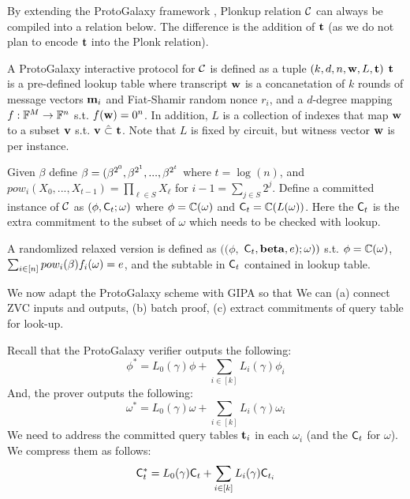 By extending the ProtoGalaxy framework \cite{ProtoGalaxy},
Plonkup relation $\mathcal C$ can always be compiled into a
relation below. The difference is the addition of ${{\mathbf {t}}}$
(as we do not plan to encode ${{\mathbf {t}}}$ into the Plonk relation).

\begin{definition} A ProtoGalaxy interactive protocol for
$\mathcal C$ is defined as a tuple $(k, d, n, {{\mathbf {w}}}, L, {{\mathbf {t}}})$
${{\mathbf {t}}}$ is a pre-defined lookup table
where transcript ${{\mathbf {w}}}$ is a concanetation of
$k$ rounds of message vectors ${{\mathbf {m}}}_i$ and 
Fiat-Shamir random nonce $r_i$, and a $d$-degree mapping
$f: \mathbb{F}^M \rightarrow \mathbb{F}^n$ s.t. 
$f({{\mathbf {w}}}) = 0^n$. In addition, $L$ is a collection of
indexes that map ${{\mathbf {w}}}$ to a subset ${{\mathbf {v}}}$ s.t.
${{\mathbf {v}}} ~\hat{\subset}~ {{\mathbf {t}}}$. Note that $L$ is fixed by circuit,
but witness vector ${{\mathbf {w}}}$ is per instance.
\end{definition}

\begin{definition} Given $\beta$ define 
${{\mathbf {\beta}}} = (\beta^{2^0}, \beta^{2^1}, ..., \beta^{2^t}$
where $t= \log(n)$, and $pow_i(X_0, ..., X_{t-1}) = \prod_{\ell \in S} X_\ell$
for $i-1 = \sum_{j\in S} 2^j$. Define
a committed instance of $\mathcal C$ as
$(\phi, {\mathsf{C}}_t ;\omega)$ where $\phi = \mathbb{C}(\omega)$
and ${\mathsf{C}}_t = \mathbb{C}(L(\omega))$.  Here the ${\mathsf{C}}_t$ is the
extra commitment to the subset of $\omega$ which needs to be
checked with lookup.
\end{definition}

\begin{definition} A randomlized relaxed version is defined as
$((\phi,$ ${\mathsf{C}}_t, {{\mathbf {beta}}}, e); \omega))$ s.t.
$\phi = \mathbb{C}(\omega)$, $\sum_{i\in [n]} pow_i({{\mathbf {\beta}}})f_i(\omega) = e$,
and the subtable in ${\mathsf{C}}_t$ contained in lookup table.
\end{definition}

We now adapt the ProtoGalaxy scheme with GIPA so that
We can (a) connect ZVC inputs and outputs, (b) batch proof,
(c) extract commitments of query table for look-up.

Recall that the ProtoGalaxy verifier outputs the following:
\[
	\phi^* = L_0(\gamma) \phi + \sum_{i\in [k]}L_i(\gamma) \phi_i
\]
And, the prover outputs the following:
\[
	\omega^* = L_0(\gamma) \omega + \sum_{i\in [k]}L_i(\gamma) \omega_i
\]
We need to address the committed query tables ${{\mathbf {t}}}_i$ in
each $\omega_i$ (and the ${\mathsf{C}}_t$ for $\omega$). 
We compress them as follows:
\begin{equation}
	{\mathsf{C}}_t^* = L_0(\gamma) {\mathsf{C}}_t + \sum_{i\in[k]} L_i(\gamma) {\mathsf{C}}_{t_i} \label{eq-tstar}
\end{equation}

